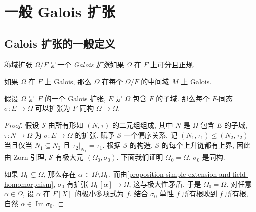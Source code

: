 \section{一般 Galois 扩张}

\subsection{Galois 扩张的一般定义}

称域扩张 \( \Omega/F \) 是一个\emph{ Galois 扩张}如果 \( \Omega \) 在 \( F \)
上可分且正规.

\begin{proposition}
  如果 \( \Omega \) 在 \( F \) 上 Galois, 那么 \( \Omega \) 在每个 \( \Omega/F
  \) 的中间域 \( M \) 上 Galois.
\end{proposition}

\begin{proposition}
  \label{proposition-homomorphism-extend-to-Galois-isomorphism}
  假设 \( \Omega \) 是 \( F \) 的一个 Galois 扩张, \( E \) 是 \( \Omega \) 包含
  \( F \) 的子域.
  那么每个 \( F \)-同态 \( \sigma: E \to \Omega \) 可以扩张为 \( F \)-同构 \(
  \Omega \to \Omega \).
\end{proposition}
\begin{proof}
  假设 \( \mathcal{S} \) 由所有形如 \( (N, \tau) \) 的二元组组成, 其中 \( N \)
  是 \( \Omega \) 包含 \( E \) 的子域, \( \tau: N \to \Omega \) 为 \( \sigma: E
  \to \Omega \) 的扩张.
  赋予 \( \mathcal{S} \) 一个偏序关系, 记 \( (N_1, \tau_1) \leq (N_2, \tau_2) \)
  当且仅当 \( N_1 \subseteq N_2 \) 且 \( \left. \tau_2 \right\vert_{N_1} =
    \tau_1 \).
  根据 \( \mathcal{S} \) 的构造, \( \mathcal{S} \) 的每个上升链都有上界, 因此由
  Zorn 引理, \( \mathcal{S} \) 有极大元 \( (\Omega_0, \sigma_0) \).
  下面我们证明 \( \Omega_0 = \Omega \), \( \sigma_0 \) 是同构.

  如果 \( \Omega_0 \subsetneq \Omega \), 那么存在 \( \alpha \in \Omega \setminus
  \Omega_0 \).
  而由\cref{proposition-simple-extension-and-field-homomorphism}, \( \sigma_0 \)
  有扩张 \( \Omega_0[\alpha] \to \Omega \), 这与极大性矛盾.
  于是 \( \Omega_0 = \Omega \).
  对任意 \( \alpha \in \Omega \), 设 \( \alpha \) 在 \( F[X] \) 的极小多项式为
  \( f \).
  结合 \( \sigma_0 \) 单性  \( f \) 所有根映到 \( f \) 所有根, 自然 \(
  \alpha \in \operatorname{Im} \sigma_0 \).
\end{proof}

